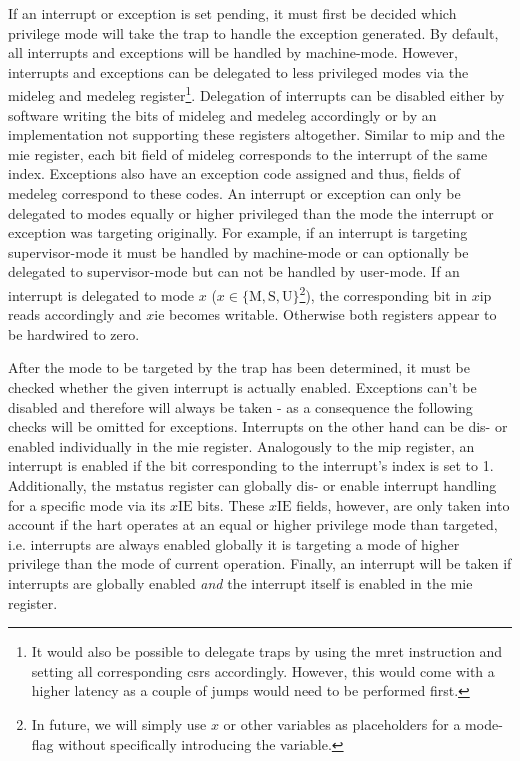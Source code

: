 If an interrupt or exception is set pending, it must first be decided which privilege mode will take the trap to handle the exception generated.
By default, all interrupts and exceptions will be handled by machine-mode.
However, interrupts and exceptions can be delegated to less privileged modes via the \gls{mideleg} and \gls{medeleg} register\footnote{%
    It would also be possible to delegate traps by using the \gls{mret} instruction and setting all corresponding \glspl{csr} accordingly.
    However, this would come with a higher latency as a couple of jumps would need to be performed first.
}.
Delegation of interrupts can be disabled either by software writing the bits of \gls{mideleg} and \gls{medeleg} accordingly or by an implementation not supporting these registers altogether.
Similar to \gls{mip} and the \gls{mie} register, each bit field of \gls{mideleg} corresponds to the interrupt of the same index.
Exceptions also have an exception code assigned and thus, fields of \gls{medeleg} correspond to these codes.
An interrupt or exception can only be delegated to modes equally or higher privileged than the mode the interrupt or exception was targeting originally.
For example, if an interrupt is targeting supervisor-mode it must be handled by machine-mode or can optionally be delegated to supervisor-mode but can not be handled by user-mode.
If an interrupt is delegated to mode $ x $ ($ x \in \{ \text{M}, \text{S}, \text{U}\} $\footnote{%
In future, we will simply use $ x $ or other variables as placeholders for a mode-flag without specifically introducing the variable.
}), the corresponding bit in $ x\text{ip} $ reads accordingly and $ x\text{ie} $ becomes writable.
Otherwise both registers appear to be hardwired to zero.

After the mode to be targeted by the trap has been determined, it must be checked whether the given interrupt is actually enabled.
Exceptions can't be disabled and therefore will always be taken - as a consequence the following checks will be omitted for exceptions.
Interrupts on the other hand can be dis- or enabled individually in the \gls{mie} register.
Analogously to the \gls{mip} register, an interrupt is enabled if the bit corresponding to the interrupt's index is set to 1.
Additionally, the \gls{mstatus} register can globally dis- or enable interrupt handling for a specific mode via its $ x\text{IE} $ bits.
These $ x\text{IE} $ fields, however, are only taken into account if the \gls{hart} operates at an equal or higher privilege mode than targeted, i.e. interrupts are always enabled globally it is targeting a mode of higher privilege than the mode of current operation.
Finally, an interrupt will be taken if interrupts are globally enabled \textit{and} the interrupt itself is enabled in the \gls{mie} register.

